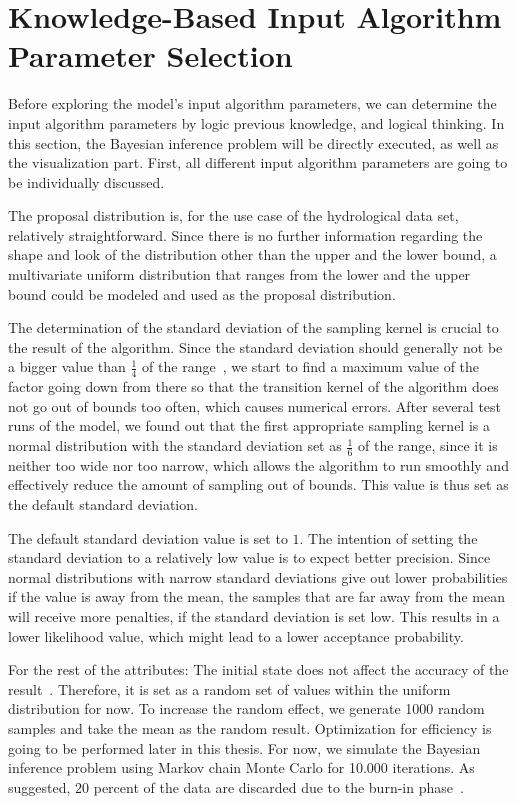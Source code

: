 \section{Knowledge-Based Input Algorithm Parameter Selection}

Before exploring the model's input algorithm parameters, we can determine the input algorithm parameters by logic previous knowledge, and logical thinking. In this section, the Bayesian inference problem will be directly executed, as well as the visualization part. First, all different input algorithm parameters are going to be individually discussed.

The proposal distribution is, for the use case of the hydrological data set, relatively straightforward. Since there is no further information regarding the shape and look of the distribution other than the upper and the lower bound, a multivariate uniform distribution that ranges from the lower and the upper bound could be modeled and used as the proposal distribution.

The determination of the standard deviation of the sampling kernel is crucial to the result of the algorithm. Since the standard deviation should generally not be a bigger value than $\frac 1 4$ of the range~\cite{good_standard_deviation}, we start to find a maximum value of the factor going down from there so that the transition kernel of the algorithm does not go out of bounds too often, which causes numerical errors. After several test runs of the model, we found out that the first appropriate sampling kernel is a normal distribution with the standard deviation set as $\frac 1 6$ of the range, since it is neither too wide nor too narrow, which allows the algorithm to run smoothly and effectively reduce the amount of sampling out of bounds. This value is thus set as the default standard deviation.

The default standard deviation value is set to $1$. The intention of setting the standard deviation to a relatively low value is to expect better precision. Since normal distributions with narrow standard deviations give out lower probabilities if the value is away from the mean, the samples that are far away from the mean will receive more penalties, if the standard deviation is set low. This results in a lower likelihood value, which might lead to a lower acceptance probability.

For the rest of the attributes: The initial state does not affect the accuracy of the result~\cite{mcmc_practice}. Therefore, it is set as a random set of values within the uniform distribution for now. To increase the random effect, we generate 1000 random samples and take the mean as the random result. Optimization for efficiency is going to be performed later in this thesis. For now, we simulate the Bayesian inference problem using Markov chain Monte Carlo for 10.000 iterations. As suggested, $20$ percent of the data are discarded due to the burn-in phase~\cite{20per_burnin}.


